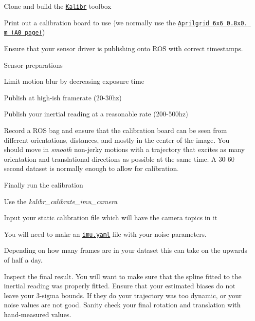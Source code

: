 \begin{DoxyEnumerate}
\item Clone and build the \href{https://github.com/ethz-asl/kalibr/}{\tt Kalibr} toolbox
\item Print out a calibration board to use (we normally use the \href{https://drive.google.com/file/d/0B0T1sizOvRsUdjFJem9mQXdiMTQ/edit?usp=sharing}{\tt Aprilgrid 6x6 0.\+8x0. m (A0 page)})
\item Ensure that your sensor driver is publishing onto R\+OS with correct timestamps.
\item Sensor preparations
\begin{DoxyItemize}
\item Limit motion blur by decreasing exposure time
\item Publish at high-\/ish framerate (20-\/30hz)
\item Publish your inertial reading at a reasonable rate (200-\/500hz)
\end{DoxyItemize}
\item Record a R\+OS bag and ensure that the calibration board can be seen from different orientations, distances, and mostly in the center of the image. You should move in {\itshape smooth} non-\/jerky motions with a trajectory that excites as many orientation and translational directions as possible at the same time. A 30-\/60 second dataset is normally enough to allow for calibration.
\item Finally run the calibration
\begin{DoxyItemize}
\item Use the {\itshape kalibr\+\_\+calibrate\+\_\+imu\+\_\+camera}
\item Input your static calibration file which will have the camera topics in it
\item You will need to make an \href{https://drive.google.com/file/d/0B0T1sizOvRsUSk9ReDlid0VSY3M/edit?usp=sharing}{\tt imu.\+yaml} file with your noise parameters.
\item Depending on how many frames are in your dataset this can take on the upwards of half a day.
\end{DoxyItemize}
\item Inspect the final result. You will want to make sure that the spline fitted to the inertial reading was properly fitted. Ensure that your estimated biases do not leave your 3-\/sigma bounds. If they do your trajectory was too dynamic, or your noise values are not good. Sanity check your final rotation and translation with hand-\/measured values. 
\end{DoxyEnumerate}